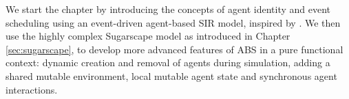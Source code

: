\medskip

We start the chapter by introducing the concepts of agent identity and event scheduling using an event-driven agent-based SIR model, inspired by \cite{macal_agent-based_2010}. We then use the highly complex Sugarscape model as introduced in Chapter \ref{sec:sugarscape}, to develop more advanced features of ABS in a pure functional context: dynamic creation and removal of agents during simulation, adding a shared mutable environment, local mutable agent state and synchronous agent interactions. 





